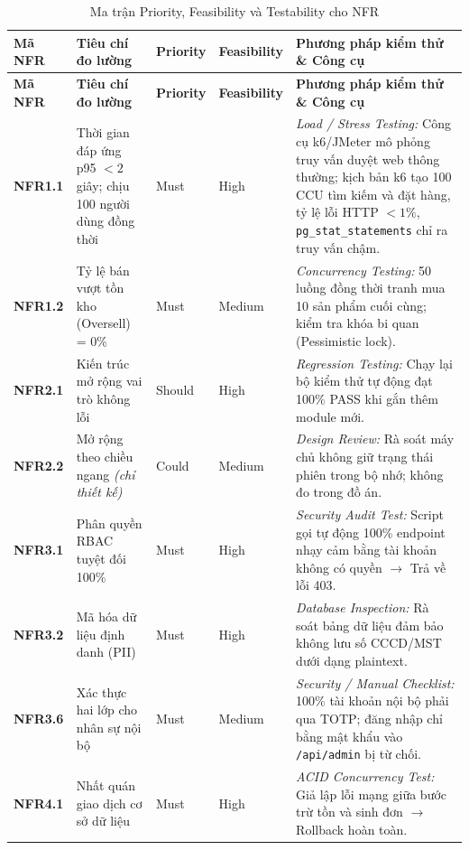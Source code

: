 \begingroup
\tblsetup\tblzebra
\begin{longtable}{L{1.52cm} L{4.20cm} >{\centering\arraybackslash}p{1.65cm} >{\centering\arraybackslash}p{2.00cm} L{4.82cm}}
\caption{Ma trận Priority, Feasibility và Testability cho NFR}
\label{tab:nfr-matrix} \\
\toprule
{}
\textbf{Mã NFR} & \textbf{Tiêu chí đo lường} & \textbf{Priority} & \textbf{Feasibility} & \textbf{Phương pháp kiểm thử \& Công cụ} \\
\midrule
\endfirsthead
\toprule
{}
\textbf{Mã NFR} & \textbf{Tiêu chí đo lường} & \textbf{Priority} & \textbf{Feasibility} & \textbf{Phương pháp kiểm thử \& Công cụ} \\
\midrule
\endhead
\bottomrule
\endfoot
\textbf{NFR1.1} & Thời gian đáp ứng p95 $< 2$ giây; chịu 100 người dùng đồng thời & Must & High & \textit{Load / Stress Testing:} Công cụ k6/JMeter mô phỏng truy vấn duyệt web thông thường; kịch bản k6 tạo 100 CCU tìm kiếm và đặt hàng, tỷ lệ lỗi HTTP $< 1\%$, \texttt{pg\_stat\_statements} chỉ ra truy vấn chậm. \\
\textbf{NFR1.2} & Tỷ lệ bán vượt tồn kho (Oversell) = 0\% & Must & Medium & \textit{Concurrency Testing:} 50 luồng đồng thời tranh mua 10 sản phẩm cuối cùng; kiểm tra khóa bi quan (Pessimistic lock). \\
\textbf{NFR2.1} & Kiến trúc mở rộng vai trò không lỗi & Should & High & \textit{Regression Testing:} Chạy lại bộ kiểm thử tự động đạt 100\% PASS khi gắn thêm module mới. \\
\textbf{NFR2.2} & Mở rộng theo chiều ngang \textit{(chỉ thiết kế)} & Could & Medium & \textit{Design Review:} Rà soát máy chủ không giữ trạng thái phiên trong bộ nhớ; không đo trong đồ án. \\
\textbf{NFR3.1} & Phân quyền RBAC tuyệt đối 100\% & Must & High & \textit{Security Audit Test:} Script gọi tự động 100\% endpoint nhạy cảm bằng tài khoản không có quyền $\rightarrow$ Trả về lỗi 403. \\
\textbf{NFR3.2} & Mã hóa dữ liệu định danh (PII) & Must & High & \textit{Database Inspection:} Rà soát bảng dữ liệu đảm bảo không lưu số CCCD/MST dưới dạng plaintext. \\
\textbf{NFR3.6} & Xác thực hai lớp cho nhân sự nội bộ & Must & Medium & \textit{Security / Manual Checklist:} 100\% tài khoản nội bộ phải qua TOTP; đăng nhập chỉ bằng mật khẩu vào \texttt{/api/admin} bị từ chối. \\
\textbf{NFR4.1} & Nhất quán giao dịch cơ sở dữ liệu & Must & High & \textit{ACID Concurrency Test:} Giả lập lỗi mạng giữa bước trừ tồn và sinh đơn $\rightarrow$ Rollback hoàn toàn. \\

\end{longtable}
